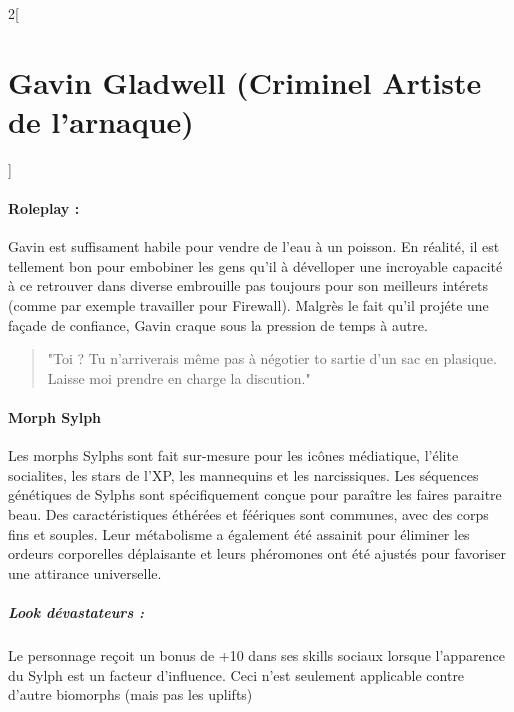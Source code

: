 \documentclass[a4paper,9pt]{article}
\begin{document}
\begin{multicols}{2}[\section*{Gavin Gladwell (Criminel Artiste de l'arnaque)}]
   \paragraph{Roleplay :}
   Gavin est suffisament habile pour vendre de l'eau à un poisson.
   En réalité, il est tellement bon pour embobiner les gens qu'il à dévelloper
   une incroyable capacité à ce retrouver dans diverse embrouille pas toujours
   pour son meilleurs intérets (comme par exemple travailler pour Firewall).
   Malgrès le fait qu'il projéte une façade de confiance, Gavin craque sous
   la pression de temps à autre.

   \begin{quote}
      "Toi ? Tu n'arriverais même pas à négotier to sartie d'un sac en plasique.
      Laisse moi prendre en charge la discution."
   \end{quote}

   \paragraph{Morph Sylph}

   Les morphs Sylphs sont fait sur-mesure pour les icônes médiatique, l'élite
   socialites, les stars de l'XP, les mannequins et les narcissiques. Les
   séquences génétiques de Sylphs sont spécifiquement conçue pour paraître
   les faires paraitre beau. Des caractéristiques éthérées et féériques sont
   communes, avec des corps fins et souples. Leur métabolisme a également été
   assainit pour éliminer les ordeurs corporelles déplaisante et leurs
   phéromones ont été ajustés pour favoriser une attirance universelle.

   \subparagraph{Look dévastateurs :}
   Le personnage reçoit un bonus de +10 dans ses skills sociaux lorsque
   l'apparence du Sylph est un facteur d'influence.
   Ceci n'est seulement applicable contre d'autre biomorphs (mais pas les uplifts)


\end{multicols}
\end{document}
